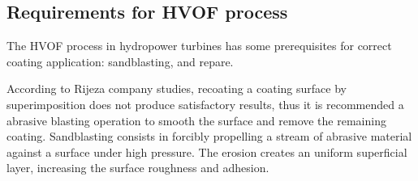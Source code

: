 \subsection{Requirements for HVOF process}

The HVOF process in hydropower turbines has some prerequisites for correct
coating application: sandblasting, and repare. %


According to Rijeza company studies, recoating a coating surface by
superimposition does not produce satisfactory results, thus it is recommended
a abrasive blasting operation to smooth the surface and remove the remaining
coating. Sandblasting consists in forcibly propelling a stream of abrasive material
against a surface under high pressure. The erosion creates an uniform
superficial layer, increasing the surface roughness and
adhesion.



